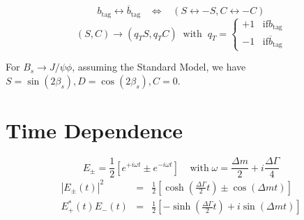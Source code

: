 \documentclass[a4paper,9pt,twoside]{article}
\begin{document}
\begin{equation}
b_\mathrm{tag} \leftrightarrow \overline{b}_\mathrm{tag} \;\;\;\Leftrightarrow\;\;\;  ( S \leftrightarrow -S, C\leftrightarrow -C ) 
\end{equation}
\begin{equation}
(S,C) \rightarrow (q_T S, q_T C) \;\; \mathrm{with}\;\; q_T = \left\{\begin{array}{l} +1 \;\;\; \mathrm{if} b_\mathrm{tag} \\
                                                                                   -1 \;\;\; \mathrm{if} \overline{b}_\mathrm{tag}
\end{array} \right.
\end{equation}

For $B_s\rightarrow J/\psi\phi$, assuming the Standard Model,  we have $S=\sin(2\beta_s),D=\cos(2\beta_s),C=0$.


\section{Time Dependence}

\begin{equation}
  E_\pm = \frac{1}{2} \left[ e^{+i\omega t } \pm e^{-i\omega t } \right]\;\;\;\;\mathrm{with}\;
   \omega = \frac{\Delta m}{2} + i\frac{\Delta \Gamma}{4} 
\end{equation}
\begin{eqnarray}
 | E_\pm(t) |^2  &=& \frac{1}{2}\left[ \cosh\left(\frac{\Delta\Gamma}{2}t\right) \pm \cos\left(\Delta m t \right) \right] \\
 E_+^*(t)E_-(t)  &=& \frac{1}{2}\left[ -\sinh\left(\frac{\Delta\Gamma}{2}t\right) + i \sin\left(\Delta m t \right) \right]
\end{eqnarray}
\end{document}
